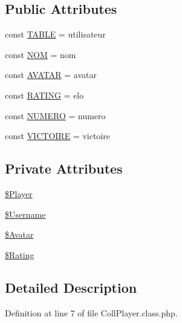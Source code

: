 \subsection*{Public Attributes}
\begin{DoxyCompactItemize}
\item 
const \hyperlink{class_coll_player_aedaacd415cfe00a481997c365e2e5439}{T\+A\+B\+LE} = \textquotesingle{}utilisateur\textquotesingle{}
\item 
const \hyperlink{class_coll_player_a721885387ff4ee2683981debbcc0b3ea}{N\+OM} = \textquotesingle{}nom\textquotesingle{}
\item 
const \hyperlink{class_coll_player_ac4c81f5eb76a72f9bf3603f340e9b2b3}{A\+V\+A\+T\+AR} = \textquotesingle{}avatar\textquotesingle{}
\item 
const \hyperlink{class_coll_player_a78aa3b39b3ae67612104d3b1c1e97c6c}{R\+A\+T\+I\+NG} = \textquotesingle{}elo\textquotesingle{}
\item 
const \hyperlink{class_coll_player_a153bf00b2546a3b0950d867e478bcbbe}{N\+U\+M\+E\+RO} = \textquotesingle{}numero\textquotesingle{}
\item 
const \hyperlink{class_coll_player_a9e7f37b5adcc9973111bad614c8f3b5f}{V\+I\+C\+T\+O\+I\+RE} = \textquotesingle{}victoire\textquotesingle{}
\end{DoxyCompactItemize}
\subsection*{Private Attributes}
\begin{DoxyCompactItemize}
\item 
\hyperlink{class_coll_player_ad5d514aaef38afc65b7ca9de3def3940}{\$\+Player}
\item 
\hyperlink{class_coll_player_abe4789c716627c912277cbe1e7d14e76}{\$\+Username}
\item 
\hyperlink{class_coll_player_a6b44c5a294b6fd616a8e83fe7d9796d2}{\$\+Avatar}
\item 
\hyperlink{class_coll_player_ac2f98835cb28209928906fc452b68a83}{\$\+Rating}
\end{DoxyCompactItemize}


\subsection{Detailed Description}


Definition at line 7 of file Coll\+Player.\+class.\+php.




